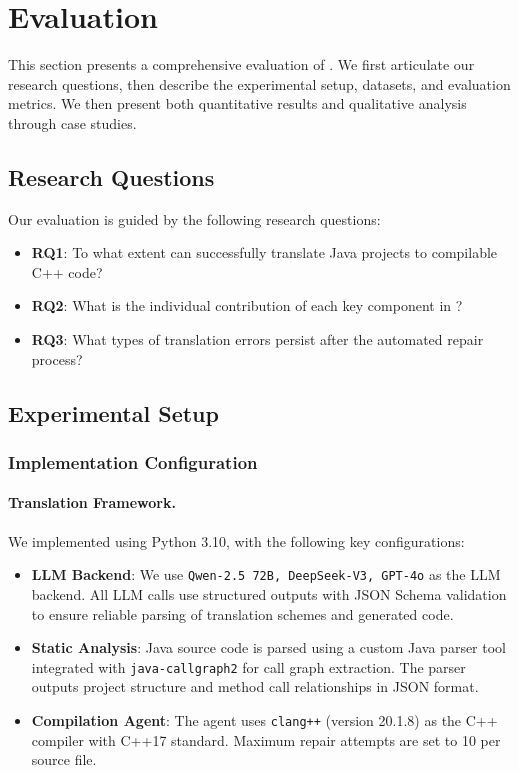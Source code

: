 
\section{Evaluation}

This section presents a comprehensive evaluation of \tool{}. We first articulate our research questions, then describe the experimental setup, datasets, and evaluation metrics. We then present both quantitative results and qualitative analysis through case studies.

\subsection{Research Questions}

Our evaluation is guided by the following research questions:

\begin{itemize}
\item \textbf{RQ1}: To what extent can \tool{} successfully translate Java projects to compilable C++ code? 

\item \textbf{RQ2}: What is the individual contribution of each key component in \tool{}? 

\item \textbf{RQ3}: What types of translation errors persist after the automated repair process? 
\end{itemize}

\subsection{Experimental Setup}

\subsubsection{Implementation Configuration}

\paragraph{Translation Framework.} We implemented \tool{} using Python 3.10, with the following key configurations:

\begin{itemize}
\item \textbf{LLM Backend}: We use \texttt{Qwen-2.5 72B, DeepSeek-V3, GPT-4o} as the LLM backend. All LLM calls use structured outputs with JSON Schema validation to ensure reliable parsing of translation schemes and generated code.

\item \textbf{Static Analysis}: Java source code is parsed using a custom Java parser tool integrated with \texttt{java-callgraph2} for call graph extraction. The parser outputs project structure and method call relationships in JSON format.

\item \textbf{Compilation Agent}: The agent uses \texttt{clang++} (version 20.1.8) as the C++ compiler with C++17 standard. Maximum repair attempts are set to 10 per source file.
\end{itemize}

